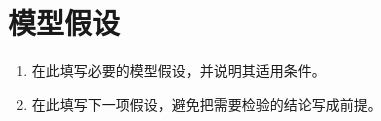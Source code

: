 \section{模型假设}
\begin{enumerate}[label=\arabic*.]
  \item 在此填写必要的模型假设，并说明其适用条件。
  \item 在此填写下一项假设，避免把需要检验的结论写成前提。
\end{enumerate}
